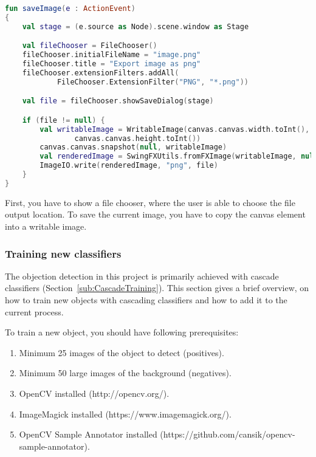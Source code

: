 \begin{lstlisting}[caption={Save image controller code.}, label={lst:saveImage}, language=Kotlin, escapechar=$]
fun saveImage(e : ActionEvent)
{
    val stage = (e.source as Node).scene.window as Stage

    val fileChooser = FileChooser()
    fileChooser.initialFileName = "image.png"
    fileChooser.title = "Export image as png"
    fileChooser.extensionFilters.addAll(
            FileChooser.ExtensionFilter("PNG", "*.png"))

    val file = fileChooser.showSaveDialog(stage)

    if (file != null) {
        val writableImage = WritableImage(canvas.canvas.width.toInt(),
                canvas.canvas.height.toInt())
        canvas.canvas.snapshot(null, writableImage)
        val renderedImage = SwingFXUtils.fromFXImage(writableImage, null)
        ImageIO.write(renderedImage, "png", file)
    }
}
\end{lstlisting}

First, you have to show a file chooser, where the user is able to choose the file output location. To save the current image, you have to copy the canvas element into a writable image.

\subsubsection{Training new classifiers}

The objection detection in this project is primarily achieved with cascade classifiers (Section~\ref{sub:CascadeTraining}). This section gives a brief overview, on how to train new objects with cascading classifiers and how to add it to the current process.

To train a new object, you should have following prerequisites:

\renewcommand{\labelenumi}{\alph{enumi})}
\begin{enumerate}
    \item Minimum 25 images of the object to detect (positives).
    \item Minimum 50 large images of the background (negatives).
    \item OpenCV installed (http://opencv.org/).
    \item ImageMagick installed (https://www.imagemagick.org/).
    \item OpenCV Sample Annotator installed (https://github.com/cansik/opencv-sample-annotator).
\end{enumerate}

